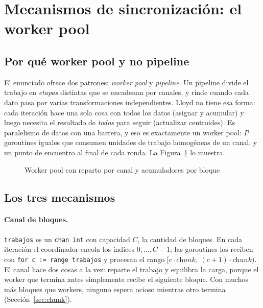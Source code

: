 \section{Mecanismos de sincronización: el worker pool}\label{sec:sync}

\subsection{Por qué worker pool y no pipeline}

El enunciado ofrece dos patrones: \emph{worker pool} y \emph{pipeline}. Un pipeline divide el
trabajo en \emph{etapas} distintas que se encadenan por canales, y rinde cuando cada dato pasa por
varias transformaciones independientes. Lloyd no tiene esa forma: cada iteración hace una sola cosa
con todos los datos (asignar y acumular) y luego necesita el resultado de \emph{todos} para seguir
(actualizar centroides). Es paralelismo de datos con una barrera, y eso es exactamente un worker
pool: $P$ goroutines iguales que consumen unidades de trabajo homogéneas de un canal, y un punto de
encuentro al final de cada ronda. La Figura~\ref{fig:workerpool-pc2} lo muestra.

\begin{figure}[H]
\caption{Worker pool con reparto por canal y acumuladores por bloque}\label{fig:workerpool-pc2}
\centering
\small

\end{figure}

\subsection{Los tres mecanismos}

\paragraph{Canal de bloques.} \texttt{trabajos} es un \texttt{chan int} con capacidad $C$, la
cantidad de bloques. En cada iteración el coordinador encola los índices $0, \dots, C-1$; las
goroutines los reciben con \texttt{for c := range trabajos} y procesan el rango
$[c \cdot \textit{chunk},\ (c+1) \cdot \textit{chunk})$. El canal hace dos cosas a la vez:
reparte el trabajo y equilibra la carga, porque el worker que termina antes simplemente recibe el
siguiente bloque. Con muchos más bloques que workers, ninguno espera ocioso mientras otro termina
(Sección~\ref{sec:chunk}).

